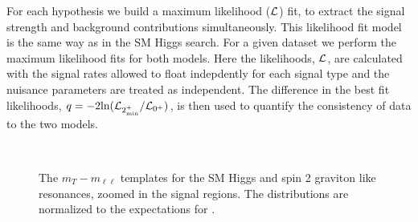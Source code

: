 For each hypothesis we build a maximum likelihood ($\cal L$) fit, 
to extract the signal strength and background contributions simultaneously. 
This likelihood fit model is the same way as in the SM Higgs search. 
For a given dataset we perform the maximum likelihood fits for both models.  
Here the likelihoods, $\cal L$, are calculated with the signal rates 
allowed to float indepdently for each signal type and the nuisance 
parameters are treated as independent. 
The difference in the best fit likelihoods, 
$q=-2\text{ln}({\cal L}_{2_\text{min}^+}/{\cal L}_{\text{0}^+})$, 
is then used to quantify the consistency of data to the two models. 

\begin{figure}[!hbtp]
\centering
{}
\\
\caption{The $m_T-m_{\ell\ell}$ templates for the SM Higgs and 
spin 2 graviton like resonances, zoomed in 
the signal regions. The distributions are 
normalized to the expectations for \intlumiEightTeV.}
\label{fig:mtvsmll_sig}
\end{figure}


